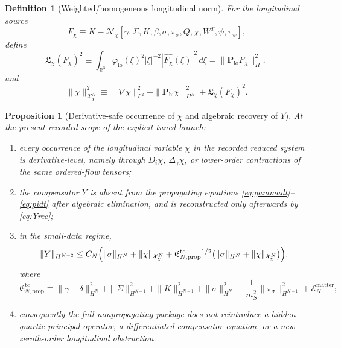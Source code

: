 \documentclass[11pt]{article}
\newtheorem{definition}{Definition}
\newtheorem{proposition}{Proposition}
\begin{document}
\begin{definition}[Weighted/homogeneous longitudinal norm]
\label{def:Xchi}
For the longitudinal source
\begin{equation}
F_\chi
\equiv
K-\mathcal N_\chi[\gamma,\Sigma,K,\beta,\sigma,\pi_\sigma,Q,\chi,W^T,\psi,\pi_\psi],
\label{eq:Fchi}
\end{equation}
define
\begin{equation}
\mathfrak L_\chi(F_\chi)^2
\equiv
\int_{\mathbb R^3}
\varphi_{\mathrm{lo}}(\xi)^2
|\xi|^{-2}
|\widehat{F_\chi}(\xi)|^2\,d\xi
=
\|\mathbf P_{\mathrm{lo}}F_\chi\|_{\dot H^{-1}}^2
\label{eq:Lchi}
\end{equation}
and
\begin{equation}
\|\chi\|_{\mathcal X_\chi^N}^2
\equiv
\|\nabla\chi\|_{L^2}^2
+\|\mathbf P_{\mathrm{hi}}\chi\|_{H^N}^2
+\mathfrak L_\chi(F_\chi)^2.
\label{eq:Xchi}
\end{equation}
\end{definition}

\begin{proposition}[Derivative-safe occurrence of \texorpdfstring{\(\chi\)}{chi} and algebraic recovery of \texorpdfstring{\(Y\)}{Y}]
\label{prop:derivative}
At the present recorded scope of the explicit tuned branch:
\begin{enumerate}
    \item every occurrence of the longitudinal variable \(\chi\) in the recorded reduced system is derivative-level, namely through \(D_i\chi\), \(\Delta_\gamma\chi\), or lower-order contractions of the same ordered-flow tensors;
    \item the compensator \(Y\) is absent from the propagating equations \eqref{eq:gammadt}--\eqref{eq:pidt} after algebraic elimination, and is reconstructed only afterwards by \eqref{eq:Yrec};
    \item in the small-data regime,
    \begin{equation}
    \|Y\|_{H^{N-2}}
    \le
    C_N
    \Bigl(
    \|\sigma\|_{H^N}
    +\|\chi\|_{\mathcal X_\chi^N}
    +\mathfrak E_{N,\mathrm{prop}}^{\mathrm{tc}}{}^{1/2}
    \bigl(
    \|\sigma\|_{H^N}+\|\chi\|_{\mathcal X_\chi^N}
    \bigr)
    \Bigr),
    \label{eq:Ybound}
    \end{equation}
    where
    \begin{equation}
    \mathfrak E_{N,\mathrm{prop}}^{\mathrm{tc}}
    \equiv
    \|\gamma-\delta\|_{H^N}^2
    +\|\Sigma\|_{H^{N-1}}^2
    +\|K\|_{H^{N-1}}^2
    +\|\sigma\|_{H^N}^2
    +\frac{1}{m_S^2}\|\pi_\sigma\|_{H^{N-1}}^2
    +\mathcal E_N^{\mathrm{matter}};
    \label{eq:Eprop}
    \end{equation}
    \item consequently the full nonpropagating package does not reintroduce a hidden quartic principal operator, a differentiated compensator equation, or a new zeroth-order longitudinal obstruction.
\end{enumerate}
\end{proposition}
\end{document}
